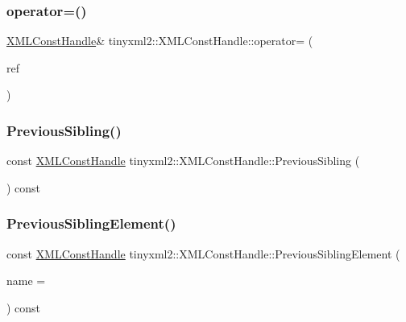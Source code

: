 \subsubsection{\texorpdfstring{operator=()}{operator=()}}
{\footnotesize\ttfamily \mbox{\hyperlink{classtinyxml2_1_1_x_m_l_const_handle}{X\+M\+L\+Const\+Handle}}\& tinyxml2\+::\+X\+M\+L\+Const\+Handle\+::operator= (\begin{DoxyParamCaption}\item[{const \mbox{\hyperlink{classtinyxml2_1_1_x_m_l_const_handle}{X\+M\+L\+Const\+Handle}} \&}]{ref }\end{DoxyParamCaption})\hspace{0.3cm}{\ttfamily [inline]}}

\mbox{\label{classtinyxml2_1_1_x_m_l_const_handle_acf68cc7930e4ac883e0c7e16ef2fbb66}} 
\subsubsection{\texorpdfstring{Previous\+Sibling()}{PreviousSibling()}}
{\footnotesize\ttfamily const \mbox{\hyperlink{classtinyxml2_1_1_x_m_l_const_handle}{X\+M\+L\+Const\+Handle}} tinyxml2\+::\+X\+M\+L\+Const\+Handle\+::\+Previous\+Sibling (\begin{DoxyParamCaption}{ }\end{DoxyParamCaption}) const\hspace{0.3cm}{\ttfamily [inline]}}

\mbox{\label{classtinyxml2_1_1_x_m_l_const_handle_aef99308659f2617299ac29980769a91e}} 
\subsubsection{\texorpdfstring{Previous\+Sibling\+Element()}{PreviousSiblingElement()}}
{\footnotesize\ttfamily const \mbox{\hyperlink{classtinyxml2_1_1_x_m_l_const_handle}{X\+M\+L\+Const\+Handle}} tinyxml2\+::\+X\+M\+L\+Const\+Handle\+::\+Previous\+Sibling\+Element (\begin{DoxyParamCaption}\item[{const char $\ast$}]{name = {} }\end{DoxyParamCaption}) const\hspace{0.3cm}{\ttfamily [inline]}}

